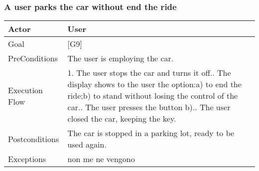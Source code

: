 \documentclass[english]{article}
\begin{document}
	\subsubsection{A user parks the car without end the ride} 	\begin{tabularx}{\textwidth}{  l  X  } 		\hline 		Actor & User\\ 		\hline 		Goal & [G9]\\ 		\hline 		PreConditions & The user is employing the car.\\ 		\hline 		Execution Flow & 1. The user stops the car and turns it off.\newline 										 2. The display shows to the user the option:\newline 										 					a) to end the ride;\newline 															b) to stand without losing the control of the car.\newline 										 3. The user presses the button b).\newline 										 4. The user closed the car, keeping the key.\\ 		\hline 		Postconditions & The car is stopped in a parking lot, ready to be used again.\\ 		\hline 		Exceptions & non me ne vengono\\ 		\hline 	\end{tabularx}
\end{document}
